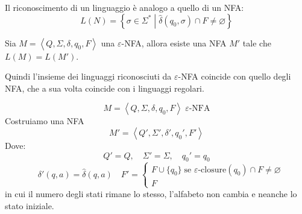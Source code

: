 \documentclass[a4paper]{article}
\begin{document}
\vspace{1em}
\noindent
Il riconoscimento di un linguaggio è analogo a quello di un NFA:
\[
  L(N) = \left\{ \sigma \in \Sigma^*
  \;\left|\; \hat{\delta}(q_0, \sigma) \cap F \neq \varnothing \right.\right\}
\] 
\begin{theorem}
  Sia \( M = \left<Q, \Sigma, \delta, q_0, F \right> \) una \( \varepsilon \)-NFA, allora
  esiste una NFA \( M' \) tale che \( L(M) = L(M') \).

  Quindi l'insieme dei linguaggi riconosciuti da \( \varepsilon  \)-NFA coincide
  con quello degli NFA, che a sua volta coincide con i linguaggi regolari.

  \vspace{1em}
  \noindent
  \[
    M = \left<Q, \Sigma, \delta, q_0, F \right> \; \varepsilon\text{-NFA}
  \] 
  Costruiamo una NFA
  \[
    M' = \left<Q', \Sigma', \delta', q_0', F' \right>
  \]
  Dove:
  \[
    Q'=Q, \quad \Sigma'=\Sigma, \quad q_0'=q_0 
  \] 
  \[
   \quad \delta'(q,a)=\hat{\delta}(q,a) \quad
    F'= \begin{cases}
      F \cup \{q_0\} \; \text{se } \varepsilon\text{-closure}(q_0) \cap F \neq \varnothing\\
      F
    \end{cases}
  \] 
  in cui il numero degli stati rimane lo stesso, l'alfabeto non cambia e neanche lo stato
  iniziale.
\end{theorem}
\end{document}
